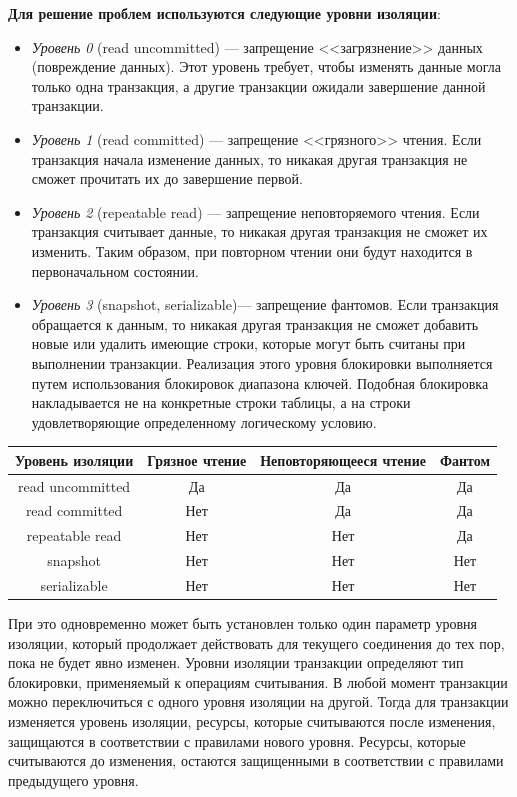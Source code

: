 \textbf{Для решение проблем используются следующие уровни изоляции}:
\begin{itemize}
	\item \textit{Уровень 0} (read uncommitted) --- запрещение <<загрязнение>> данных (повреждение данных). Этот уровень требует, чтобы изменять данные могла только одна транзакция, а другие транзакции ожидали завершение данной транзакции.
	\item \textit{Уровень 1} (read committed) --- запрещение <<грязного>> чтения. Если транзакция начала изменение данных, то никакая другая транзакция не сможет прочитать их до завершение первой.
	\item \textit{Уровень 2} (repeatable read) --- запрещение неповторяемого чтения. Если транзакция считывает данные, то никакая другая транзакция не сможет их изменить. Таким образом, при повторном чтении они будут находится в первоначальном состоянии.
	\item \textit{Уровень 3} (snapshot, serializable)--- запрещение фантомов. Если транзакция обращается к данным, то никакая другая транзакция не сможет добавить новые или удалить имеющие строки, которые могут быть считаны при выполнении транзакции. Реализация этого уровня блокировки выполняется путем использования блокировок диапазона ключей. Подобная блокировка накладывается не на конкретные строки таблицы, а на строки удовлетворяющие определенному логическому условию.
\end{itemize}
\begin{table}[ht!]
	\begin{center}
		\label{tbl:lvl_izo}
		\begin{tabular}{|c|c|c|c|}
			\hline
			Уровень изоляции & Грязное чтение & Неповторяющееся чтение & Фантом \\
			\hline
			read uncommitted & Да & Да & Да\\
			\hline
			read committed & Нет & Да & Да\\
			\hline
			repeatable read & Нет & Нет & Да\\
			\hline
			snapshot & Нет & Нет & Нет\\
			\hline
			serializable & Нет & Нет & Нет\\
			\hline
		\end{tabular}
	\end{center}
\end{table}
При это одновременно может быть установлен только один параметр уровня изоляции, который продолжает действовать для текущего соединения до тех пор, пока не будет явно изменен.
Уровни изоляции транзакции определяют тип блокировки, применяемый к операциям считывания.
В любой момент транзакции можно переключиться с одного уровня изоляции на другой.
Тогда для транзакции изменяется уровень изоляции, ресурсы, которые считываются после изменения, защищаются в соответствии с правилами нового уровня. Ресурсы, которые считываются до изменения, остаются защищенными в соответствии с правилами предыдущего уровня.

